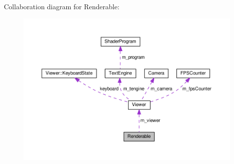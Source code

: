 Collaboration diagram for Renderable\+:\nopagebreak
\begin{figure}[H]
\begin{center}
\leavevmode
\includegraphics[width=350pt]{classRenderable__coll__graph}
\end{center}
\end{figure}
